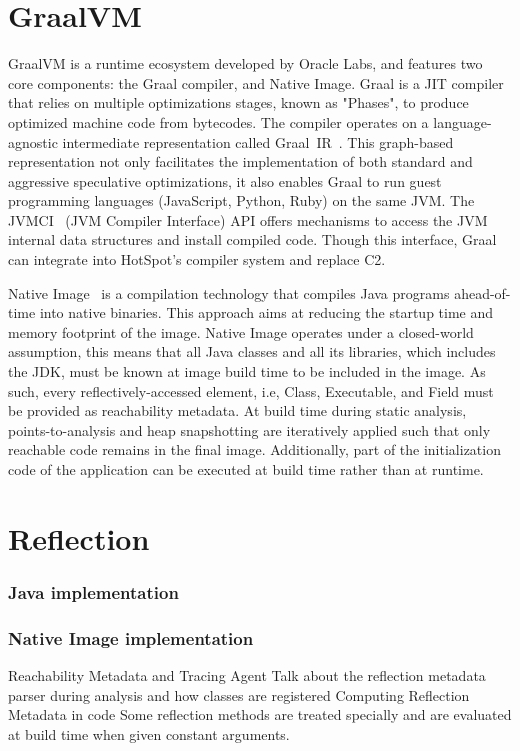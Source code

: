 \section{GraalVM}
GraalVM is a runtime ecosystem developed by Oracle Labs, and features two core components: the Graal compiler, and Native Image.
Graal is a JIT compiler that relies on multiple optimizations stages, known as "Phases", to produce optimized machine code from bytecodes. The compiler operates on a language-agnostic intermediate representation called Graal~IR~\cite{duboscq_graal_nodate}. This graph-based representation not only facilitates the implementation of both standard and aggressive speculative optimizations, it also enables Graal to run guest programming languages (JavaScript, Python, Ruby) on the same JVM. 
The JVMCI~\cite{noauthor_jep_nodate} (JVM Compiler Interface) API offers mechanisms to access the JVM internal data structures and install compiled code. Though this interface, Graal can integrate into HotSpot's compiler system and replace C2. 

Native Image~\cite{noauthor_native_nodate, noauthor_native_nodate-1, wimmer_initialize_2019} is a compilation technology that compiles Java programs ahead-of-time into native binaries. This approach aims at reducing the startup time and memory footprint of the image. Native Image operates under a closed-world assumption, this means that all Java classes and all its libraries, which includes the JDK, must be known at image build time to be included in the image. As such, every reflectively-accessed element, i.e, Class, Executable, and Field must be provided as reachability metadata. 
At build time during static analysis, points-to-analysis and heap snapshotting are iteratively applied such that only reachable code remains in the final image. Additionally, part of the initialization code of the application can be executed at build time rather than at runtime.


\section{Reflection}

\subsubsection{Java implementation}

\subsubsection{Native Image implementation}
Reachability Metadata and Tracing Agent
Talk about the reflection metadata parser during analysis and how classes are registered
Computing Reflection Metadata in code
Some reflection methods are treated specially and are evaluated at build time when given constant arguments.


